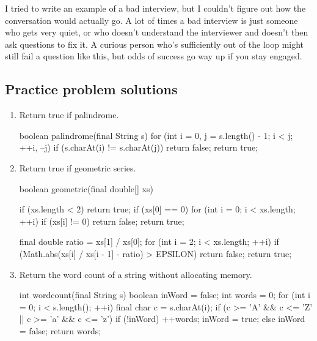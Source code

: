 \documentclass{article}
\begin{document}
      I tried to write an example of a bad interview, but I couldn't figure out
      how the conversation would actually go. A lot of times a bad interview is
      just someone who gets very quiet, or who doesn't understand the
      interviewer and doesn't then ask questions to fix it. A curious person
      who's sufficiently out of the loop might still fail a question like this,
      but odds of success go way up if you stay engaged.

\subsection{Practice problem solutions}\label{sec:practice-problem-solutions}
\begin{enumerate}
\item{Return true if palindrome.}

\begin{javacode}
boolean palindrome(final String s) {
  for (int i = 0, j = s.length() - 1; i < j; ++i, --j)
    if (s.charAt(i) != s.charAt(j))
      return false;
  return true;
} \end{javacode}

\item{Return true if geometric series.}

\begin{javacode}
boolean geometric(final double[] xs) {
  if (xs.length < 2)
    return true;
  if (xs[0] == 0) {
    for (int i = 0; i < xs.length; ++i)
      if (xs[i] != 0)
        return false;
    return true;
  }

  final double ratio = xs[1] / xs[0];
  for (int i = 2; i < xs.length; ++i)
    if (Math.abs(xs[i] / xs[i - 1] - ratio) > EPSILON)
      return false;
  return true;
} \end{javacode}

\item{Return the word count of a string without allocating memory.}

\begin{javacode}
int wordcount(final String s) {
  boolean inWord = false;
  int     words  = 0;
  for (int i = 0; i < s.length(); ++i) {
    final char c = s.charAt(i);
    if (c >= 'A' && c <= 'Z' || c >= 'a' && c <= 'z') {
      if (!inWord)
        ++words;
      inWord = true;
    } else
      inWord = false;
  }
  return words;
} \end{javacode}
\end{enumerate}
\end{document}
